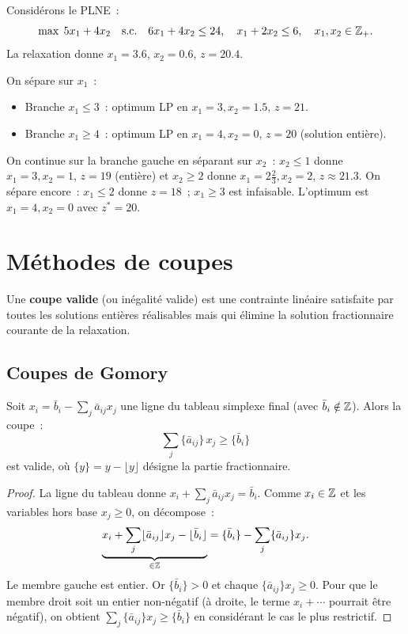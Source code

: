 \begin{exemple}
Consid\'erons le PLNE~:
\[
  \max\; 5x_1 + 4x_2 \quad \text{s.c.} \quad
  6x_1 + 4x_2 \leq 24, \quad x_1 + 2x_2 \leq 6, \quad
  x_1, x_2 \in \mathbb{Z}_+.
\]
La relaxation donne $x_1 = 3.6$, $x_2 = 0.6$, $z = 20.4$.

On s\'epare sur $x_1$~:
\begin{itemize}
  \item Branche $x_1 \leq 3$~: optimum LP en $x_1 = 3, x_2 = 1.5$,
        $z = 21$.
  \item Branche $x_1 \geq 4$~: optimum LP en $x_1 = 4, x_2 = 0$,
        $z = 20$ (solution enti\`ere).
\end{itemize}
On continue sur la branche gauche en s\'eparant sur $x_2$~:
$x_2 \leq 1$ donne $x_1 = 3, x_2 = 1$, $z = 19$ (enti\`ere) et
$x_2 \geq 2$ donne $x_1 = 2\tfrac{2}{3}, x_2 = 2$, $z \approx 21.3$.
On s\'epare encore~: $x_1 \leq 2$ donne $z = 18$~; $x_1 \geq 3$ est
infaisable. L'optimum est $x_1 = 4, x_2 = 0$ avec $z^* = 20$.
\end{exemple}

\section{M\'ethodes de coupes}

\begin{definition}
Une \textbf{coupe valide} (ou in\'egalit\'e valide) est une contrainte
lin\'eaire satisfaite par toutes les solutions enti\`eres r\'ealisables mais
qui \'elimine la solution fractionnaire courante de la relaxation.
\end{definition}

\subsection{Coupes de Gomory}

\begin{theoreme}
Soit $x_i = \bar{b}_i - \sum_j \bar{a}_{ij} x_j$ une ligne du tableau
simplexe final (avec $\bar{b}_i \notin \mathbb{Z}$). Alors la coupe~:
\[
  \sum_j \{\bar{a}_{ij}\} \, x_j \geq \{\bar{b}_i\}
\]
est valide, o\`u $\{y\} = y - \lfloor y \rfloor$ d\'esigne la partie
fractionnaire.
\end{theoreme}

\begin{proof}
La ligne du tableau donne $x_i + \sum_j \bar{a}_{ij} x_j = \bar{b}_i$.
Comme $x_i \in \mathbb{Z}$ et les variables hors base $x_j \geq 0$, on d\'ecompose~:
\[
  \underbrace{x_i + \sum_j \lfloor \bar{a}_{ij} \rfloor x_j
  - \lfloor \bar{b}_i \rfloor}_{\in \mathbb{Z}}
  = \{\bar{b}_i\} - \sum_j \{\bar{a}_{ij}\} x_j.
\]
Le membre gauche est entier. Or $\{\bar{b}_i\} > 0$ et chaque
$\{\bar{a}_{ij}\} x_j \geq 0$. Pour que le membre droit soit un entier
non-n\'egatif (\`a droite, le terme $x_i + \cdots$ pourrait \^etre n\'egatif),
on obtient $\sum_j \{\bar{a}_{ij}\} x_j \geq \{\bar{b}_i\}$ en
consid\'erant le cas le plus restrictif.
\end{proof}

